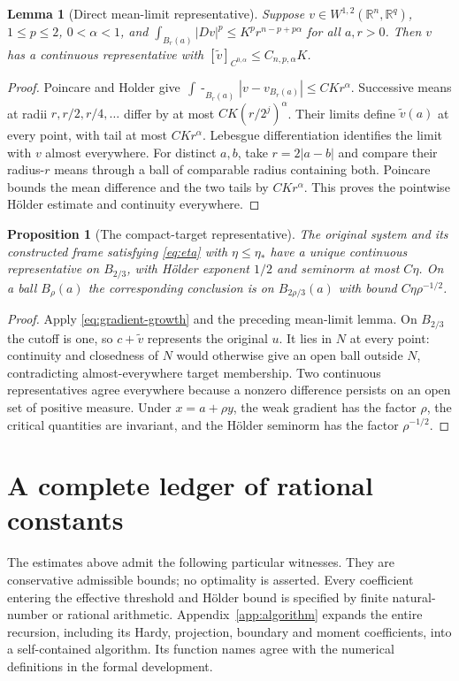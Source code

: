 \documentclass[11pt,a4paper]{article}
\numberwithin{equation}{section}
\newtheorem{proposition}[theorem]{Proposition}
\newtheorem{lemma}[theorem]{Lemma}
\theoremstyle{definition}
\theoremstyle{remark}
\newcommand{\R}{\mathbb R}
\newcommand{\fint}{\mathop{\int\!\!\!\!-}}
\begin{document}
\begin{lemma}[Direct mean-limit representative]\label{lem:representative}
Suppose $v\in W^{1,2}(\R^n,\R^q)$, $1\leq p\leq2$, $0<\alpha<1$,
and
$\int_{B_r(a)}|Dv|^p\leq K^pr^{n-p+p\alpha}$ for all $a,r>0$.
Then $v$ has a continuous representative with
$[\widetilde v]_{C^{0,\alpha}}\leq C_{n,p,\alpha}K$.
\end{lemma}
\begin{proof}
Poincare and Holder give
$\fint_{B_r(a)}|v-v_{B_r(a)}|\leq CKr^\alpha$.
Successive means at radii $r,r/2,r/4,\ldots$ differ by at most
$CK(r/2^j)^\alpha$. Their limits define $\widetilde v(a)$ at every
point, with tail at most $CKr^\alpha$. Lebesgue differentiation
identifies the limit with $v$ almost everywhere. For distinct $a,b$,
take $r=2|a-b|$ and compare their radius-$r$ means through a ball
of comparable radius containing both. Poincare bounds the mean
difference and the two tails by $CKr^\alpha$. This proves the
pointwise H\"older estimate and continuity everywhere.
\end{proof}

\begin{proposition}[The compact-target representative]\label{prop:system-rep}
The original system and its constructed frame satisfying
\eqref{eq:eta} with $\eta\leq\eta_*$ have a unique continuous
representative on $B_{2/3}$, with H\"older exponent $1/2$ and seminorm
at most $C\eta$. On a ball $B_\rho(a)$ the corresponding conclusion
is on $B_{2\rho/3}(a)$ with bound $C\eta\rho^{-1/2}$.
\end{proposition}
\begin{proof}
Apply \eqref{eq:gradient-growth} and the preceding mean-limit lemma.
On $B_{2/3}$ the cutoff is one, so $c+\widetilde v$ represents the
original $u$. It lies in $N$ at every point: continuity and closedness
of $N$ would otherwise give an open ball outside $N$, contradicting
almost-everywhere target membership. Two continuous representatives
agree everywhere because a nonzero difference persists on an open set
of positive measure. Under $x=a+\rho y$, the weak gradient has the
factor $\rho$, the critical quantities are invariant, and the H\"older
seminorm has the factor $\rho^{-1/2}$.
\end{proof}

\section{A complete ledger of rational constants}\label{sec:constants}
The estimates above admit the following particular witnesses. They are
conservative admissible bounds; no optimality is asserted. Every coefficient
entering the effective threshold and H\"older bound is specified by finite
natural-number or rational arithmetic.
Appendix~\ref{app:algorithm} expands the entire recursion, including its
Hardy, projection, boundary and moment coefficients, into a self-contained
algorithm. Its function names agree with the numerical definitions in the
formal development.
\end{document}
